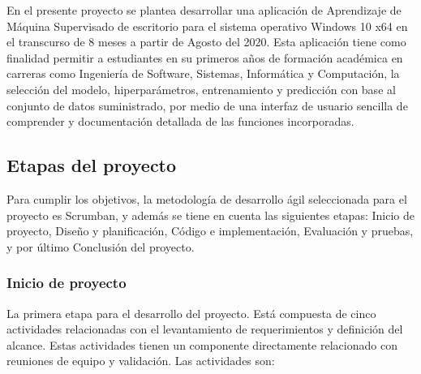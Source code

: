 En el presente proyecto se plantea desarrollar una aplicación de Aprendizaje de Máquina Supervisado de escritorio para el sistema operativo Windows 10 x64 en el transcurso de 8 meses a partir de Agosto del 2020. Esta aplicación tiene como finalidad permitir a estudiantes en su primeros años de formación académica en carreras como Ingeniería de Software, Sistemas, Informática y Computación, la selección del modelo, hiperparámetros, entrenamiento y predicción con base al conjunto de datos suministrado, por medio de una interfaz de usuario sencilla de comprender y documentación detallada de las funciones incorporadas.

\subsection{Etapas del proyecto}

Para cumplir los objetivos, la metodología de desarrollo ágil seleccionada para el proyecto es Scrumban, y además se tiene en cuenta las siguientes etapas: Inicio de proyecto, Diseño y planificación, Código e implementación, Evaluación y pruebas, y por último Conclusión del proyecto.

\subsubsection{Inicio de proyecto}
La primera etapa para el desarrollo del proyecto. Está compuesta de cinco actividades relacionadas con el levantamiento de requerimientos y definición del alcance. Estas actividades tienen un componente directamente relacionado con reuniones de equipo y validación. Las actividades son:


